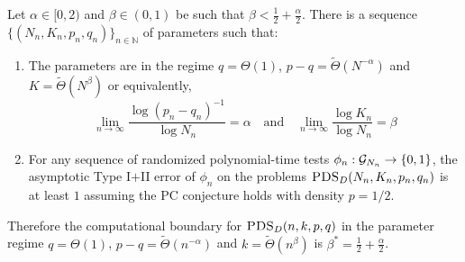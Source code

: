 \begin{theorem} \label{thm:gauss-hard}
Let $\alpha \in [0, 2)$ and $\beta \in (0, 1)$ be such that $\beta < \frac{1}{2} + \frac{\alpha}{2}$. There is a sequence $\{ (N_n, K_n, p_n, q_n) \}_{n \in \mathbb{N}}$ of parameters such that:
\begin{enumerate}
\item The parameters are in the regime $q = \Theta(1)$, $p - q = \tilde{\Theta}(N^{-\alpha})$ and $K = \tilde{\Theta}(N^\beta)$ or equivalently,
$$\lim_{n \to \infty} \frac{\log (p_n - q_n)^{-1}}{\log N_n} = \alpha \quad \text{and} \quad \lim_{n \to \infty} \frac{\log K_n}{\log N_n} = \beta$$
\item For any sequence of randomized polynomial-time tests $\phi_n : \mathcal{G}_{N_n} \to \{0, 1\}$, the asymptotic Type I$+$II error of $\phi_n$ on the problems $\textsc{PDS}_D(N_n, K_n, p_n, q_n)$ is at least $1$ assuming the PC conjecture holds with density $p = 1/2$.
\end{enumerate}
Therefore the computational boundary for $\textsc{PDS}_D(n, k, p, q)$ in the parameter regime $q = \Theta(1)$, $p - q = \tilde{\Theta}(n^{-\alpha})$ and $k = \tilde{\Theta}(n^\beta)$ is $\beta^* = \frac{1}{2} + \frac{\alpha}{2}$.
\end{theorem}

